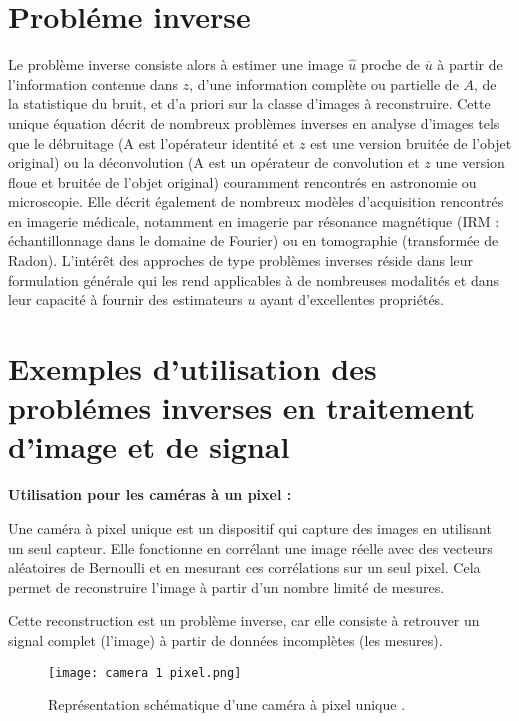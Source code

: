 \documentclass[a4paper, 12pt]{article} %
\begin{document}
\section*{Probléme inverse}
Le problème inverse consiste alors à estimer une image $\hat{u}$ proche de $\overline{u}$ à partir de l'information contenue dans $z$, d'une information complète ou partielle de $A$, de la statistique du bruit, et d'a priori sur la classe d'images à reconstruire. Cette unique équation décrit de nombreux problèmes inverses en analyse d'images tels que le débruitage (A est l'opérateur identité et $z$ est une version bruitée de l'objet original) ou la déconvolution (A est un opérateur de convolution et $z$ une version floue et bruitée de l'objet original) couramment rencontrés en astronomie ou microscopie. Elle décrit également de nombreux modèles d'acquisition rencontrés en imagerie médicale, notamment en imagerie par résonance magnétique (IRM : échantillonnage dans le domaine de Fourier) ou en tomographie (transformée de Radon). L'intérêt des approches de type problèmes inverses réside dans leur formulation générale qui les rend applicables à de nombreuses modalités et dans leur capacité à fournir des estimateurs $u$ ayant d'excellentes propriétés.






\section{\large Exemples d'utilisation des problémes inverses en traitement d'image et de signal}

\textbf{Utilisation pour les caméras à un  pixel :}

Une caméra à pixel unique est un dispositif qui capture des images en utilisant un seul capteur. Elle fonctionne en corrélant une image réelle avec des vecteurs aléatoires de Bernoulli et en mesurant ces corrélations sur un seul pixel. Cela permet de reconstruire l'image à partir d'un nombre limité de mesures.

Cette reconstruction est un problème inverse, car elle consiste à retrouver un signal complet (l'image) à partir de données incomplètes (les mesures). 

\begin{figure}[h] %
    \centering
    \texttt{[image: camera 1 pixel.png]}
    \caption{Représentation schématique d'une caméra à pixel unique  \cite{rice_single_pixel_camera}.}
    \label{fig:mon_label}
\end{figure}
\end{document}
